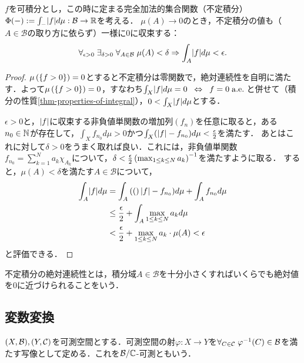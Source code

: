 \documentclass[uplatex, dvipdfmx]{jsreport}
\renewcommand{\B}{\mathcal{B}}
\begin{document}
\begin{theorem}[不定積分は絶対連続な加法的集合関数である]\label{thm-indefinite-integral-is-absolutely-continuous}
    $f$を可積分とし，この時に定まる完全加法的集合関数（不定積分）$\Phi(-):=\int_{-}\abs{f}d\mu:\B\to\R$を考える．
    $\mu(A)\to 0$のとき，不定積分の値も（$A\in\B$の取り方に依らず）一様に$0$に収束する：
    \[\forall_{\epsilon>0}\;\exists_{\delta>0}\;\forall_{A\in\B}\;\mu(A)<\delta\Rightarrow\int_A\abs{f}d\mu<\epsilon.\]
\end{theorem}
\begin{proof}
    $\mu\left(\left\{f>0\right\}\right)=0$とすると不定積分は零関数で，絶対連続性を自明に満たす．よって$\mu\left(\left\{f>0\right\}\right)=0$，すなわち$\int_X\lvert f\rvert d\mu=0\;\;\Leftrightarrow\;\; f=0\;\mathrm{a.e.}\;$と併せて（積分の性質\ref{thm-properties-of-integral}），$0<\int_X\lvert f\rvert d\mu$とする．

    $\epsilon>0$と，$\lvert f\rvert$に収束する非負値単関数の増加列$(f_n)$を任意に取ると，ある$n_0\in\mathbb{N}$が存在して，$\int_Xf_{n_0}d\mu>0$かつ$\int_X(\lvert f\rvert-f_{n_0})d\mu<\frac{\epsilon}{2}$を満たす．
    あとはこれに対して$\delta>0$をうまく取れば良い．これには，非負値単関数$f_{n_0}=\sum^N_{k=1}a_k\chi_{A_k}$について，$\delta<\frac{\epsilon}{2}\left(\max_{1\le k\le N}a_k\right)^{-1}$を満たすように取る．
    すると，$\mu(A)<\delta$を満たす$A\in\B$について，
    \begin{align*}
        \int_A\lvert f\rvert d\mu&=\int_A\left((\right)\lvert f\rvert-f_{n_0})d\mu+\int_Af_{n_0}d\mu\\
        &\le\frac{\epsilon}{2}+\int_A\max_{1\le k\le N}a_kd\mu\\
        &<\frac{\epsilon}{2}+\max_{1\le k\le N}a_k\cdot\mu(A)<\epsilon
    \end{align*}
    と評価できる．
\end{proof}
\begin{remarks}
    不定積分の絶対連続性とは，積分域$A\in\B$を十分小さくすればいくらでも絶対値を$0$に近づけられることをいう．
\end{remarks}

\subsection{変数変換}

\begin{definition}
    $(X,\B),(Y,\cC)$を可測空間とする．可測空間の射$\varphi:X\to Y$を$\forall_{C\in\cC}\;\varphi^{-1}(C)\in\B$を満たす写像として定める．これを$\B/\C$-可測ともいう．
\end{definition}
\end{document}
